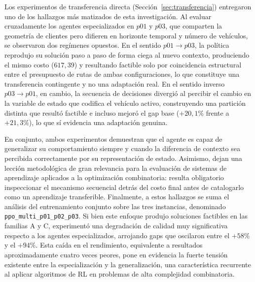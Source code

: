 Los experimentos de transferencia directa (Sección~\ref{sec:transferencia}) entregaron uno de los hallazgos más matizados de esta investigación. Al evaluar cruzadamente los agentes especializados en $p01$ y $p03$, que comparten la geometría de clientes pero difieren en horizonte temporal y número de vehículos, se observaron dos regímenes opuestos. En el sentido $p01 \rightarrow p03$, la política reprodujo su solución paso a paso de forma ciega al nuevo contexto, produciendo el mismo costo ($617{,}39$) y resultando factible solo por coincidencia estructural entre el presupuesto de rutas de ambas configuraciones, lo que constituye una transferencia contingente y no una adaptación real. En el sentido inverso $p03 \rightarrow p01$, en cambio, la secuencia de decisiones divergió al percibir el cambio en la variable de estado que codifica el vehículo activo, construyendo una partición distinta que resultó factible e incluso mejoró el gap base ($+20{,}1\%$ frente a $+21{,}3\%$), lo que sí evidencia una adaptación genuina.

En conjunto, ambos experimentos demuestran que el agente es capaz de generalizar su comportamiento siempre y cuando la diferencia de contexto sea percibida correctamente por su representación de estado. Asimismo, dejan una lección metodológica de gran relevancia para la evaluación de sistemas de aprendizaje aplicados a la optimización combinatoria: resulta obligatorio inspeccionar el mecanismo secuencial detrás del costo final antes de catalogarlo como un aprendizaje transferible. Finalmente, a estos hallazgos se suma el análisis del entrenamiento conjunto sobre las tres instancias, denominado \texttt{ppo\_multi\_p01\_p02\_p03}. Si bien este enfoque produjo soluciones factibles en las familias A y C, experimentó una degradación de calidad muy significativa respecto a los agentes especializados, arrojando gaps que oscilaron entre el $+58\%$ y el $+94\%$. Esta caída en el rendimiento, equivalente a resultados aproximadamente cuatro veces peores, pone en evidencia la fuerte tensión existente entre la especialización y la generalización, una característica recurrente al aplicar algoritmos de RL en problemas de alta complejidad combinatoria.


